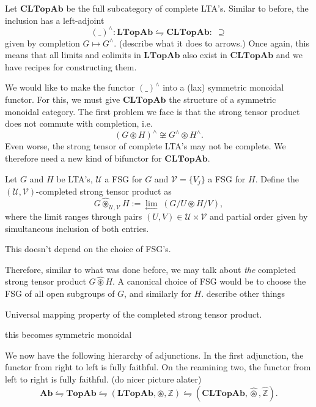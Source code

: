 \noindent Let $\textbf{CLTopAb}$ be the full subcategory of complete LTA's. Similar to before, the inclusion has a left-adjoint \begin{equation}
    (\_)^\land : \textbf{LTopAb} \leftrightharpoons \textbf{CLTopAb} : \; \supseteq
\end{equation}
given by completion $G \mapsto G^\land$. (\TODO describe what it does to arrows.) Once again, this means that all limits and colimits in $\textbf{LTopAb}$ also exist in $\textbf{CLTopAb}$ and we have recipes for constructing them.

We would like to make the functor $(\_)^\land$ into a (lax) symmetric monoidal functor. For this, we must give $\textbf{CLTopAb}$ the structure of a symmetric monoidal category. The first problem we face is that the strong tensor product does not commute with completion, i.e. $$(G \circledast H)^\land \not\cong G^\land \circledast H^\land.$$
Even worse, the strong tensor of complete LTA's may not be complete. We therefore need a new kind of bifunctor for $\textbf{CLTopAb}$.

\begin{definition} Let $G$ and $H$ be LTA's, $\mathcal{U}$ a FSG for $G$ and $\mathcal{V} = \{V_j\}$ a FSG for $H$. Define the $(\mathcal{U}, \mathcal{V})$-completed strong tensor product as
\[G \widehat{\circledast}_{\mathcal{U}, \mathcal{V}} H  := \lim_{\leftarrow} \; (G/U \circledast H/V),\]
where the limit ranges through pairs $(U, V) \in \mathcal{U} \times \mathcal{V}$ and partial order given by simultaneous inclusion of both entries.
\end{definition}

\begin{proposition} \TODO This doesn't depend on the choice of FSG's.
\end{proposition}

\noindent Therefore, similar to what was done before, we may talk about \emph{the} completed strong tensor product $G \widehat{\circledast} H$. A canonical choice of FSG would be to choose the FSG of all open subgroups of $G$, and similarly for $H$. \TODO describe other things

\begin{proposition} \TODO Universal mapping property of the completed strong tensor product.
\end{proposition}

\TODO this becomes symmetric monoidal


\begin{remark} We now have the following hierarchy of adjunctions. In the first adjunction, the functor from right to left is fully faithful. On the reamining two, the functor from left to right is fully faithful. (\TODO do nicer picture alater)
\[\textbf{Ab} \leftrightharpoons \textbf{TopAb} \leftrightharpoons (\textbf{LTopAb}, \circledast, \mathbb{Z}) \leftrightharpoons (\textbf{CLTopAb}, \widehat{\circledast}, \widehat{\mathbb{Z}}).\]
\end{remark}
